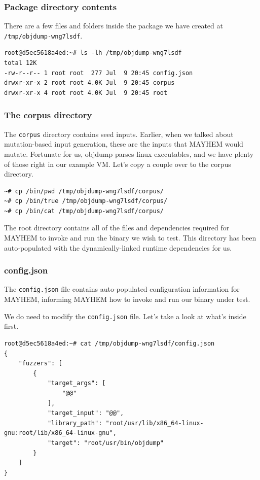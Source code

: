 \documentclass{beamer}
\begin{document}
\begin{frame}[fragile]
\frametitle{Package directory contents}
There are a few files and folders inside the package we have created at \texttt{/tmp/objdump-wng7lsdf}.

\begin{lstlisting}[basicstyle=\tiny]
root@d5ec5618a4ed:~# ls -lh /tmp/objdump-wng7lsdf
total 12K
-rw-r--r-- 1 root root  277 Jul  9 20:45 config.json
drwxr-xr-x 2 root root 4.0K Jul  9 20:45 corpus
drwxr-xr-x 4 root root 4.0K Jul  9 20:45 root
\end{lstlisting}
\end{frame}

\begin{frame}[fragile]
\frametitle{The corpus directory}
The \texttt{corpus} directory contains seed inputs. Earlier, when we talked about mutation-based input generation, these are the inputs that MAYHEM would mutate. Fortunate for us, objdump parses linux executables, and we have plenty of those right in our example VM. Let's copy a couple over to the corpus directory.

\begin{lstlisting}[basicstyle=\tiny]
~# cp /bin/pwd /tmp/objdump-wng7lsdf/corpus/
~# cp /bin/true /tmp/objdump-wng7lsdf/corpus/
~# cp /bin/cat /tmp/objdump-wng7lsdf/corpus/
\end{lstlisting}

The root directory contains all of the files and dependencies required for MAYHEM to invoke and run the binary we wish to test. This directory has been auto-populated with the dynamically-linked runtime dependencies for us.
\end{frame}

\begin{frame}[fragile]
\frametitle{config.json}

The \texttt{config.json} file contains auto-populated configuration information for MAYHEM, informing MAYHEM how to invoke and run our binary under test.

We do need to modify the \texttt{config.json} file. Let's take a look at what's inside first.

\begin{lstlisting}[basicstyle=\tiny]
root@d5ec5618a4ed:~# cat /tmp/objdump-wng7lsdf/config.json 
{
    "fuzzers": [
        {
            "target_args": [
                "@@"
            ],
            "target_input": "@@",
            "library_path": "root/usr/lib/x86_64-linux-gnu:root/lib/x86_64-linux-gnu",
            "target": "root/usr/bin/objdump"
        }
    ]
}
\end{lstlisting}
\end{frame}
\end{document}
